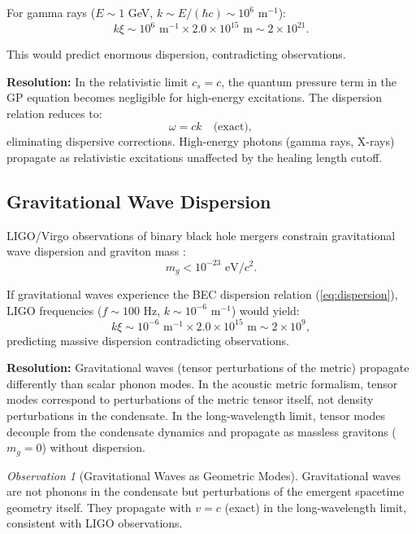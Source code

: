 \documentclass[11pt,a4paper]{article}
\newcommand{\cs}{\ensuremath{c_s}}
\theoremstyle{definition}
\theoremstyle{remark}
\newtheorem{observation}[theorem]{Observation}
\begin{document}
For gamma rays ($E \sim 1$ GeV, $k \sim E/(\hbar c) \sim 10^6$ m$^{-1}$):
\begin{equation}
k\xi \sim 10^6 \text{ m}^{-1} \times 2.0 \times 10^{15} \text{ m} \sim 2 \times 10^{21}.
\end{equation}

This would predict enormous dispersion, contradicting observations.

\textbf{Resolution:} In the relativistic limit $\cs = c$, the quantum pressure term in the GP equation becomes negligible for high-energy excitations. The dispersion relation reduces to:
\begin{equation}
\omega = c k \quad \text{(exact)},
\end{equation}
eliminating dispersive corrections. High-energy photons (gamma rays, X-rays) propagate as relativistic excitations unaffected by the healing length cutoff.

\subsection{Gravitational Wave Dispersion}
\label{sec:gw_dispersion}

LIGO/Virgo observations of binary black hole mergers constrain gravitational wave dispersion and graviton mass \cite{LIGO2021}:
\begin{equation}
m_g < 10^{-23} \text{ eV}/c^2.
\end{equation}

If gravitational waves experience the BEC dispersion relation (\ref{eq:dispersion}), LIGO frequencies ($f \sim 100$ Hz, $k \sim 10^{-6}$ m$^{-1}$) would yield:
\begin{equation}
k\xi \sim 10^{-6} \text{ m}^{-1} \times 2.0 \times 10^{15} \text{ m} \sim 2 \times 10^{9},
\end{equation}
predicting massive dispersion contradicting observations.

\textbf{Resolution:} Gravitational waves (tensor perturbations of the metric) propagate differently than scalar phonon modes. In the acoustic metric formalism, tensor modes correspond to perturbations of the metric tensor itself, not density perturbations in the condensate. In the long-wavelength limit, tensor modes decouple from the condensate dynamics and propagate as massless gravitons ($m_g = 0$) without dispersion.

\begin{observation}[Gravitational Waves as Geometric Modes]
Gravitational waves are not phonons in the condensate but perturbations of the emergent spacetime geometry itself. They propagate with $v = c$ (exact) in the long-wavelength limit, consistent with LIGO observations.
\end{observation}
\end{document}
